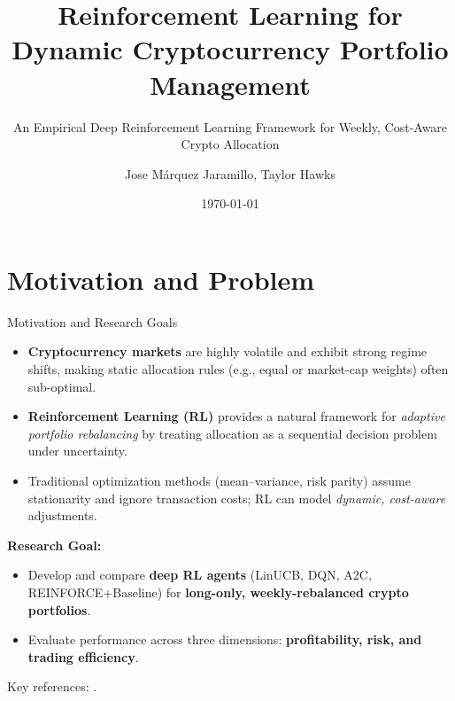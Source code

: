 \documentclass[aspectratio=169]{beamer}
\title{Reinforcement Learning for Dynamic Cryptocurrency Portfolio Management}
\subtitle{An Empirical Deep Reinforcement Learning Framework for Weekly, Cost-Aware Crypto Allocation}
\author{Jose Márquez Jaramillo, Taylor Hawks}
\institute{Johns Hopkins University}
\date{\today}
\begin{document}


{
\setcounter{framenumber}{0}
\begin{frame}[plain]
  \titlepage
\end{frame}
}

\section{Motivation and Problem}

\begin{frame}{Motivation and Research Goals}
\small
\begin{itemize}\setlength{\itemsep}{3pt}
  \item \textbf{Cryptocurrency markets} are highly volatile and exhibit strong regime shifts, making static allocation rules (e.g., equal or market-cap weights) often sub-optimal.
  \item \textbf{Reinforcement Learning (RL)} provides a natural framework for \emph{adaptive portfolio rebalancing} by treating allocation as a sequential decision problem under uncertainty.
  \item Traditional optimization methods (mean–variance, risk parity) assume stationarity and ignore transaction costs; RL can model \emph{dynamic, cost-aware} adjustments.
\end{itemize}

\vspace{0.4em}
\textbf{Research Goal:}
{\footnotesize
\begin{itemize}\setlength{\itemsep}{2pt}
  \item Develop and compare \textbf{deep RL agents} (LinUCB, DQN, A2C, REINFORCE+Baseline) for \textbf{long-only, weekly-rebalanced crypto portfolios}.
  \item Evaluate performance across three dimensions: \textbf{profitability, risk, and trading efficiency}.
\end{itemize}
}

\vspace{0.3em}
\footnotesize Key references: \citep{jiang2017cryptocurrency,jiang2017framework,cui2023cvar}.
\end{frame}
\end{document}
